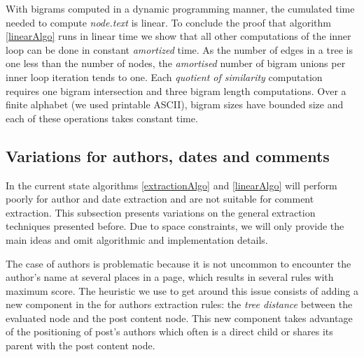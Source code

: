 \linearAlgo

With bigrams computed in a dynamic programming manner, the cumulated time needed to compute \code{(}\emph{node.text}\code{)} is linear. To conclude the proof that algorithm \ref{linearAlgo} runs in linear time we show that all other computations of the inner loop can be done in constant \emph{amortized} time. As the number of edges in a tree is one less than the number of nodes, the \emph{amortised} number of bigram unions per inner loop iteration tends to one. Each \emph{quotient of similarity} computation requires one bigram intersection and three bigram length computations. Over a finite alphabet (we used printable ASCII), bigram sizes have bounded size and each of these operations takes constant time.


\subsection{Variations for authors, dates and comments}
\label{variationsforauthorsdatesandcomments}

In the current state algorithms \ref{extractionAlgo} and \ref{linearAlgo} will perform poorly for author and date extraction and are not suitable for comment extraction. This subsection presents variations on the general extraction
\label{presentsvariationsonthegeneralextraction}techniques presented before. Due to space constraints, we will only provide the main ideas and omit algorithmic and implementation details.

The case of authors is problematic because it is not uncommon to encounter the author's name at several places in a page, which results in several rules with maximum  score. The heuristic we use to get around this issue consists of adding a new component in the  for authors extraction rules: the \emph{tree distance} between the evaluated node and the post content node. This new component takes advantage of the positioning of post's authors which often is a direct child or shares its parent with the post content node.

